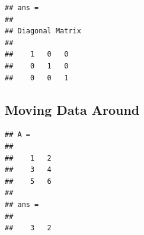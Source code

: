 \documentclass[
]{article}
\newenvironment{Shaded}{\begin{snugshade}}{\end{snugshade}}
\newcommand{\CommentTok}[1]{\textcolor[rgb]{0.56,0.35,0.01}{\textit{#1}}}
\newcommand{\FloatTok}[1]{\textcolor[rgb]{0.00,0.00,0.81}{#1}}
\newcommand{\FunctionTok}[1]{\textcolor[rgb]{0.00,0.00,0.00}{#1}}
\newcommand{\NormalTok}[1]{#1}
\newcommand{\OperatorTok}[1]{\textcolor[rgb]{0.81,0.36,0.00}{\textbf{#1}}}
\begin{document}
\begin{Shaded}
\end{Shaded}

\begin{verbatim}
## ans =
## 
## Diagonal Matrix
## 
##    1   0   0
##    0   1   0
##    0   0   1
\end{verbatim}

\begin{Shaded}
\begin{Highlighting}[]
\CommentTok{%
\CommentTok{%
\end{Highlighting}
\end{Shaded}

\hypertarget{moving-data-around}{%
\subsection{Moving Data Around}\label{moving-data-around}}

\begin{Shaded}
\end{Shaded}

\begin{verbatim}
## A =
## 
##    1   2
##    3   4
##    5   6
## 
## ans =
## 
##    3   2
\end{verbatim}

\begin{Shaded}
\end{Shaded}
\end{document}
